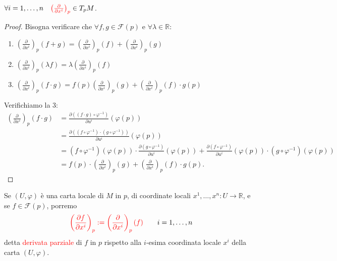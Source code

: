         \begin{proposizione}
        \mbox{}

        $\forall i = 1, \dots, n \quad \textcolor{red}{\left( \frac{\partial}{\partial x^i} \right)_p} \in T_p M$.
        \end{proposizione}

        \begin{proof}
        Bisogna verificare che $\forall f, g \in \mathcal{F}(p)$ e $\forall \lambda \in \mathbb{R}$:
        \begin{enumerate}
        \item $\left( \frac{\partial}{\partial x^i} \right)_p (f + g) = \left( \frac{\partial}{\partial x^i} \right)_p (f) + \left( \frac{\partial}{\partial x^i} \right)_p (g)$
        \item $\left( \frac{\partial}{\partial x^i} \right)_p (\lambda f) = \lambda \left( \frac{\partial}{\partial x^i} \right)_p (f)$
        \item $\left( \frac{\partial}{\partial x^i} \right)_p (f \cdot g) = f(p) \left( \frac{\partial}{\partial x^i} \right)_p (g) + \left( \frac{\partial}{\partial x^i} \right)_p (f) \cdot g(p)$
        \end{enumerate}

        Verifichiamo la 3:
        \begin{align*}
        \left( \frac{\partial}{\partial x^i} \right)_p (f \cdot g) &= \frac{\partial ((f \cdot g) \circ \varphi^{-1})}{\partial u^i} (\varphi(p)) \\
        &= \frac{\partial ((f \circ \varphi^{-1}) \cdot (g \circ \varphi^{-1}))}{\partial u^i} (\varphi(p)) \\
        &= (f \circ \varphi^{-1})(\varphi(p)) \cdot \frac{\partial (g \circ \varphi^{-1})}{\partial u^i} (\varphi(p)) + \frac{\partial (f \circ \varphi^{-1})}{\partial u^i} (\varphi(p)) \cdot (g \circ \varphi^{-1})(\varphi(p)) \\
        &= f(p) \cdot \left( \frac{\partial}{\partial x^i} \right)_p (g) + \left( \frac{\partial}{\partial x^i} \right)_p (f) \cdot g(p).
        \end{align*}
        \end{proof}

        \begin{definizione}
        \mbox{}

        Se $(U, \varphi)$ è una carta locale di $M$ in $p$, di coordinate locali $x^1, \dots, x^n : U \to \mathbb{R}$, e se $f \in \mathcal{F}(p)$, porremo
        \[
        \textcolor{red}{\left( \frac{\partial f}{\partial x^i} \right)_p := \left( \frac{\partial}{\partial x^i} \right)_p (f)} \qquad i = 1, \dots, n
        \]
        detta \textcolor{red}{derivata parziale} di $f$ in $p$ rispetto alla $i$-esima coordinata locale $x^i$ della carta $(U, \varphi)$.
        \end{definizione}

